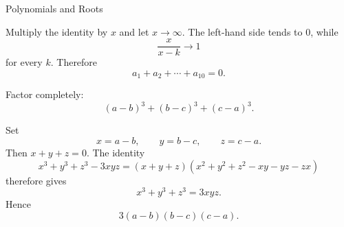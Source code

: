 \begin{expectedproblemgroup}{Polynomials and Roots}
        \begin{expectedsubsolution}
            Multiply the identity by $x$ and let $x\to\infty$. The left-hand side
            tends to $0$, while
            \[
                \frac{x}{x-k}\to1
            \]
            for every $k$. Therefore
            \[
                \boxed{a_1+a_2+\cdots+a_{10}=0}.
            \]
        \end{expectedsubsolution}

        \begin{expectedsubproblem}
            Factor completely:
            \[
                (a-b)^3+(b-c)^3+(c-a)^3.
            \]
        \end{expectedsubproblem}

        \begin{expectedsubsolution}
            Set
            \[
                x=a-b,
                \qquad
                y=b-c,
                \qquad
                z=c-a.
            \]
            Then $x+y+z=0$. The identity
            \[
                x^3+y^3+z^3-3xyz
                =
                (x+y+z)
                (x^2+y^2+z^2-xy-yz-zx)
            \]
            therefore gives
            \[
                x^3+y^3+z^3=3xyz.
            \]
            Hence
            \[
                \boxed{3(a-b)(b-c)(c-a)}.
            \]
        \end{expectedsubsolution}

    \end{expectedproblemgroup}

